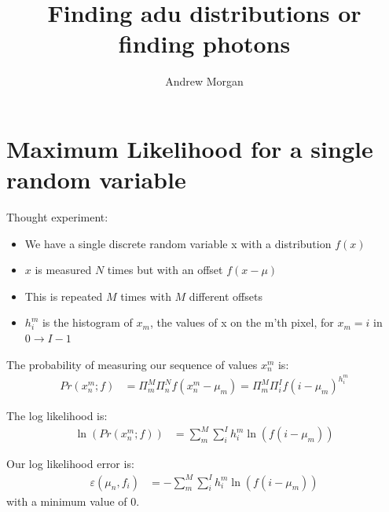 \documentclass[11pt]{article}
\title{\textbf{Finding adu distributions or finding photons}}
\author{Andrew Morgan}
\date{}
\begin{document}
\maketitle

\section{Maximum Likelihood for a single random variable}
Thought experiment:

\begin{itemize}

  \item We have a single discrete random variable x with a distribution $f(x)$
  \item $x$ is measured $N$ times but with an offset $f(x - \mu)$
  \item This is repeated $M$ times with $M$ different offsets
  \item $h^m_i$ is the histogram of $x_m$, the values of x on the m'th pixel, for $x_m = i$ in $0 \rightarrow I-1$

\end{itemize}


The probability of measuring our sequence of values $ x^m_n $ is:
\begin{align}
   Pr(x^m_n; f) &= \Pi_m^M \Pi_n^N f(x^m_n - \mu_m) = \Pi_m^M \Pi_i^I f(i - \mu_m)^{h^m_i}
\end{align}

The log likelihood is:
\begin{align}
   \ln(Pr(x^m_n; f)) &= \sum_m^M \sum_i^I h^m_i \ln(f(i - \mu_m))
\end{align}

Our log likelihood error is:
\begin{align}
   \varepsilon(\mu_n, f_i) &= -\sum_m^M \sum_i^I h^m_i \ln(f(i - \mu_m))
\end{align}
with a minimum value of 0. 
\end{document}
